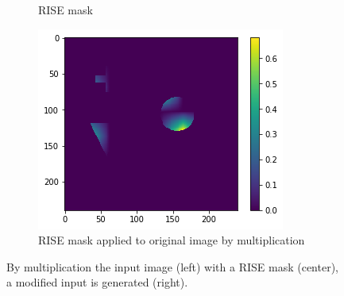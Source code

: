 \begin{figure}[H]
\begin{subfigure}[t]{.32\textwidth}
        \caption{RISE mask}
    \end{subfigure}\hfill%
    \begin{subfigure}[t]{.32\textwidth}
        \centering
        \includegraphics[width=\linewidth]{chapters/02_methods/images/rise/rise0_applied.png}
        \caption{RISE mask applied to original image by multiplication}
    \end{subfigure}
    \caption{By multiplication the input image (left) with a RISE mask (center), a modified input is generated (right).}
    \label{rise_mask0}
\end{figure}


